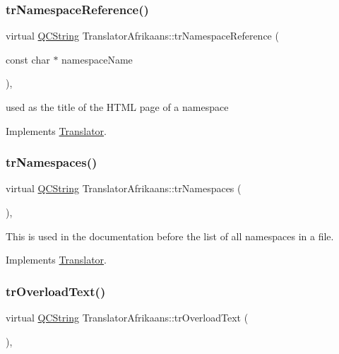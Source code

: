 \subsubsection{\texorpdfstring{trNamespaceReference()}{trNamespaceReference()}}
{\footnotesize\ttfamily virtual \mbox{\hyperlink{class_q_c_string}{Q\+C\+String}} Translator\+Afrikaans\+::tr\+Namespace\+Reference (\begin{DoxyParamCaption}\item[{const char $\ast$}]{namespace\+Name }\end{DoxyParamCaption})\hspace{0.3cm}{\ttfamily [inline]}, {\ttfamily [virtual]}}

used as the title of the H\+T\+ML page of a namespace 

Implements \mbox{\hyperlink{class_translator}{Translator}}.

\mbox{\label{class_translator_afrikaans_ade58baae995451051f96daef76d4fa6f}} 
\subsubsection{\texorpdfstring{trNamespaces()}{trNamespaces()}}
{\footnotesize\ttfamily virtual \mbox{\hyperlink{class_q_c_string}{Q\+C\+String}} Translator\+Afrikaans\+::tr\+Namespaces (\begin{DoxyParamCaption}{ }\end{DoxyParamCaption})\hspace{0.3cm}{\ttfamily [inline]}, {\ttfamily [virtual]}}

This is used in the documentation before the list of all namespaces in a file. 

Implements \mbox{\hyperlink{class_translator}{Translator}}.

\mbox{\label{class_translator_afrikaans_a2534e001fb18d675a6337b2b268451b9}} 
\subsubsection{\texorpdfstring{trOverloadText()}{trOverloadText()}}
{\footnotesize\ttfamily virtual \mbox{\hyperlink{class_q_c_string}{Q\+C\+String}} Translator\+Afrikaans\+::tr\+Overload\+Text (\begin{DoxyParamCaption}{ }\end{DoxyParamCaption})\hspace{0.3cm}{\ttfamily [inline]}, {\ttfamily [virtual]}}

